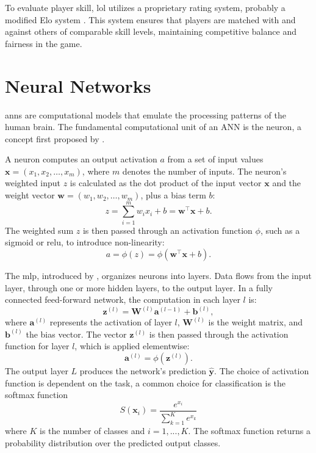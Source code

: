 \documentclass[12pt, a4paper, headinclude, twoside, plainheadsepline, open=right, numbers=noenddot, hidelinks, toc=listof, toc=bibliography]{scrreprt}
\begin{document}
To evaluate player skill, \ac{lol} utilizes a proprietary rating system, probably a modified Elo system \cite{janssonNeuralNetworksStandardizing2022}.
This system ensures that players are matched with and against others of comparable skill levels, maintaining competitive balance and fairness in the game.


\section{Neural Networks}
\label{sec:nn}

\Acp{ann} are computational models that emulate the processing patterns of the human brain. The fundamental computational unit of an ANN is the neuron, a concept first proposed by \citeauthor{mccullochLogicalCalculusIdeas1943} \cite{mccullochLogicalCalculusIdeas1943}.

A neuron computes an output activation $a$ from a set of input values $\mathbf{x} = (x_1, x_2, \ldots, x_m)$, where $m$ denotes the number of inputs. 
The neuron's weighted input $z$ is calculated as the dot product of the input vector $\mathbf{x}$ and the weight vector $\mathbf{w} = (w_1, w_2, \ldots, w_m)$, plus a bias term $b$:
\begin{equation}
z = \sum_{i=1}^{m} w_i x_i + b = \mathbf{w}^\top \mathbf{x} + b.
\end{equation}
The weighted sum $z$ is then passed through an activation function $\phi$, such as a sigmoid or \ac{relu}, to introduce non-linearity:
\begin{equation}
a = \phi(z) = \phi(\mathbf{w}^\top \mathbf{x} + b).
\end{equation}

The \ac{mlp}, introduced by \citeauthor{rosenblattPerceptronProbabilisticModel1958} \cite{rosenblattPerceptronProbabilisticModel1958}, organizes neurons into layers. 
Data flows from the input layer, through one or more hidden layers, to the output layer. In a fully connected feed-forward network, the computation in each layer $l$ is:
\begin{equation}
\mathbf{z}^{(l)} = \mathbf{W}^{(l)} \mathbf{a}^{(l-1)} + \mathbf{b}^{(l)},
\end{equation}
where $\mathbf{a}^{(l)}$ represents the activation of layer $l$, $\mathbf{W}^{(l)}$ is the weight matrix, and $\mathbf{b}^{(l)}$ the bias vector. 
The vector $\mathbf{z}^{(l)}$ is then passed through the activation function for layer $l$, which is applied elementwise:
\begin{equation}
\mathbf{a}^{(l)} = \phi (\mathbf{z}^{(l)}).
\end{equation}
The output layer $L$ produces the network's prediction $\mathbf{\hat{y}}$.
The choice of activation function is dependent on the task, a common choice for classification is the softmax function \cite{bridleProbabilisticInterpretationFeedforward1990}
\begin{equation}
\label{eq:softmax}
 S(\mathbf{x}_i) = \frac{e^{x_i}}{\sum_{k=1}^{K} e^{x_k}}
\end{equation}
where $K$ is the number of classes and $i = 1, ..., K$.
The softmax function returns a probability distribution over the predicted output classes.
\end{document}
